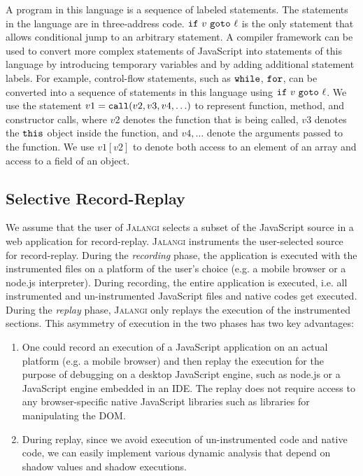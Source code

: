 \documentclass{sig-alternate}
\def\jalangi{\textsc{Jalangi}}
\newcommand \dsl [1] {\ensuremath{{\tt #1}}\xspace}
\begin{document}
A program in this language is a sequence of labeled statements.  The
statements in the language are in three-address code.  $\dsl{if}\ v\
\dsl{goto}\ \ell$ is the only statement that allows conditional jump
to an arbitrary statement.  A compiler framework can be used to
convert more complex statements of JavaScript into statements of this
language by introducing temporary variables and by adding additional
statement labels.  For example, control-flow statements, such as
\dsl{while}, \dsl{for}, can be converted into a sequence of statements
in this language using $\dsl{if}\ v\ \dsl{goto}\ \ell$.  We use the
statement $v1 = \dsl{call}(v2, v3, v4, \ldots)$ to represent function,
method, and constructor calls, where $v2$ denotes the function that is
being called, $v3$ denotes the \dsl{this} object inside the function,
and $v4, \ldots$ denote the arguments passed to the function.  We use
$v1[v2]$ to denote both access to an element of an array and access to
a field of an object.

\subsection{Selective Record-Replay}
\label{sec:unopt-select-record}

We assume that the user of \jalangi{} selects a subset of the
JavaScript source in a web application for record-replay.  \jalangi{}
instruments the user-selected source for record-replay.  During the
\emph{recording} phase, the application is executed with the
instrumented files on a platform of the user's choice (e.g. a mobile
browser or a node.js interpreter).  During recording, the entire
application is executed, i.e. all instrumented and un-instrumented
JavaScript files and native codes get executed.  During the
\emph{replay} phase, \jalangi{} only replays the execution of the
instrumented sections.  This asymmetry of execution in the two phases has
two key advantages:
\begin{enumerate}
\item One could record an execution of a JavaScript application on an
  actual platform (e.g. a mobile browser) and then replay the
  execution for the purpose of debugging on a desktop JavaScript
  engine, such as node.js or a JavaScript engine embedded in an IDE.
  The replay does not require access to any browser-specific native
  JavaScript libraries such as libraries for manipulating the DOM.
\item During replay, since we avoid execution of un-instrumented code
  and native code, we can easily implement various dynamic analysis
  that depend on shadow values and shadow executions. 
\end{enumerate}
\end{document}
